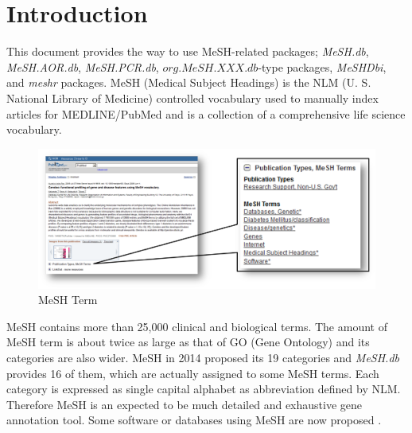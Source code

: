 \documentclass[11pt]{article}
\newcommand{\Rpackage}[1]{{\textit{#1}}}
\begin{document}
\section{Introduction}
This document provides the way to use MeSH-related packages; \Rpackage{MeSH.db}, \Rpackage{MeSH.AOR.db}, \Rpackage{MeSH.PCR.db}, $org.MeSH.XXX.db$-type packages, \Rpackage{MeSHDbi}, and \Rpackage{meshr} packages. MeSH (Medical Subject Headings) is the NLM (U. S. National Library of Medicine) controlled vocabulary used to manually index articles for MEDLINE/PubMed \cite{Nelson2004} and is a collection of a comprehensive life science vocabulary.
\begin{figure}[ht]
\centering
\includegraphics[width=\linewidth]{fig1.png}
\caption{MeSH Term}
\label{fig1}
\end{figure}
MeSH contains more than 25,000 clinical and biological terms. The amount of MeSH term is about twice as large as that of GO (Gene Ontology)\cite{Ashburner2000} and its categories are also wider. MeSH in 2014 proposed its 19 categories and \Rpackage{MeSH.db} provides 16 of them, which are actually assigned to some MeSH terms. Each category is expressed as single capital alphabet as abbreviation defined by NLM. Therefore MeSH is an expected to be much detailed and exhaustive gene annotation tool. Some software or databases using MeSH are now proposed \cite{Nakazato2007, Nakazato2009, Saurin2010, Sartor2012}.
\end{document}
